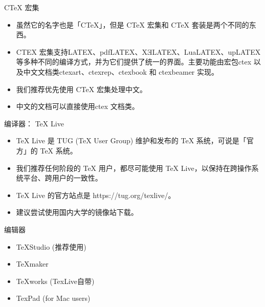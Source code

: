 \documentclass[13pt,fontset=mac]{ctexbeamer}
\begin{document}
\begin{frame}
{CTeX 宏集}
\begin{itemize}
	\item 
虽然它的名字也是「CTeX」，但是 CTeX 宏集和 CTeX 套装是两个不同的东西。
\item  CTEX 宏集支持LATEX、pdfLATEX、XƎLATEX、LuaLATEX、upLATEX 等多种不同的编译方式，并为它们提供了统一的界面。主要功能由宏包ctex 以及中文文档类ctexart、ctexrep、ctexbook 和 ctexbeamer 实现。
\item 我们推荐\alert{优先使用 CTeX 宏集处理中文}。
\item 中文的文档可以直接使用ctex 文档类。
\end{itemize}

 
\end{frame}



\begin{frame}
{ 编译器： TeX Live}

\begin{itemize}
	\item TeX Live 是 TUG (TeX User Group) 维护和发布的 TeX 系统，可说是「官方」的 TeX 系统。
	\item 我们推荐任何阶段的 TeX 用户，都尽可能使用 TeX Live，以保持在跨操作系统平台、跨用户的一致性。
	\item TeX Live 的官方站点是 https://tug.org/texlive/。
	\item 建议尝试使用国内大学的镜像站下载。
	
	
\end{itemize}
\end{frame} 

\begin{frame}{编辑器}
\begin{itemize}
\item  TeXStudio (推荐使用)
\item TeXmaker
\item TeXworks (TexLive自带)
\item TexPad (for Mac users)
\end{itemize}
\end{frame}
\end{document}
